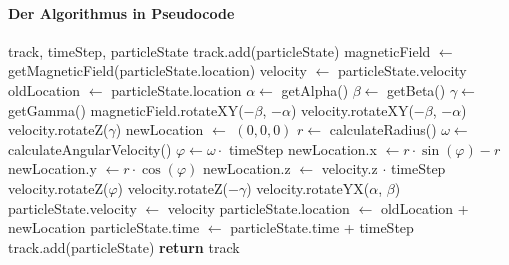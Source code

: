 \paragraph{Der Algorithmus in Pseudocode}
\label{sec:algorithmus}
\begin{algorithmic}[1]
  \STATE {}
  \STATE track, timeStep, particleState
  \STATE track.add(particleState)
  \STATE {}
  \STATE magneticField $\leftarrow$ getMagneticField(particleState.location)
  \STATE velocity $\leftarrow$ particleState.velocity
  \STATE oldLocation $\leftarrow$ particleState.location
  \STATE
  \STATE {}
  \STATE $\alpha \leftarrow$ getAlpha()
  \STATE $\beta \leftarrow$ getBeta()
  \STATE $\gamma \leftarrow$ getGamma()
  \STATE
  \STATE {}
  \STATE magneticField.rotateXY($-\beta$, $-\alpha$)
  \STATE velocity.rotateXY($-\beta$, $-\alpha$)
  \STATE velocity.rotateZ($\gamma$)
  \STATE newLocation $\leftarrow$ \(\left(0, 0, 0\right)\)
  \STATE
  \STATE {}
  \STATE $r \leftarrow$ calculateRadius()
  \STATE $\omega \leftarrow$ calculateAngularVelocity()
  \STATE $\varphi \leftarrow \omega \cdot$ timeStep
  \STATE
  \STATE {}
  \STATE newLocation.x $\leftarrow r \cdot \sin(\varphi) -r$
  \STATE newLocation.y $\leftarrow r \cdot \cos(\varphi)$
  \STATE newLocation.z $\leftarrow$ velocity.z $\cdot$ timeStep
  \STATE
  \STATE {}
  \STATE velocity.rotateZ($\varphi$)
  \STATE
  \STATE {}
  \STATE velocity.rotateZ($-\gamma$)
  \STATE velocity.rotateYX($\alpha$, $\beta$)
  \STATE particleState.velocity $\leftarrow$ velocity
  \STATE particleState.location $\leftarrow$ oldLocation + newLocation
  \STATE
  \STATE {}
  \STATE particleState.time $\leftarrow$ particleState.time + timeStep
  \STATE
  \STATE {}
  \STATE track.add(particleState)
  \ENDWHILE
  \STATE
  \STATE \textbf{return} track
\end{algorithmic}
